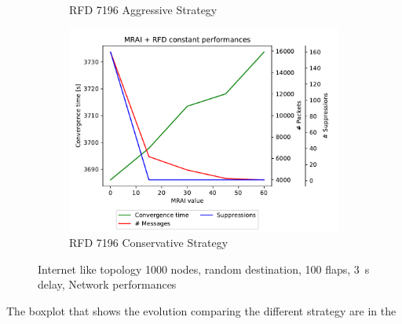 \begin{figure}[h]
\begin{subfigure}[b]{0.325\textwidth}
         \caption{RFD 7196 Aggressive Strategy}
         \label{fig:1000_7196RFDA_multiMRAI_elephants}
     \end{subfigure}
     \hfill
     \begin{subfigure}[b]{0.325\textwidth}
         \centering
         \includegraphics[width=\textwidth]{images/RFD/miceVSelephants/MultiMRAI/elephants/cisco_1000_RFD_7196_conservative-constant_mrai_rfd_evolution.pdf}
         \caption{RFD 7196 Conservative Strategy}
         \label{fig:1000_7196RFDC_multiMRAI_elephants}
     \end{subfigure}
		\caption{Internet like topology \num{1000} nodes, random destination, \num{100} flaps, \SI{3}{\second} delay, Network performances}
        \label{fig:1000_RFD_multiMRAI_elephants}
\end{figure}

The boxplot that shows the evolution comparing the different strategy are
in the 

